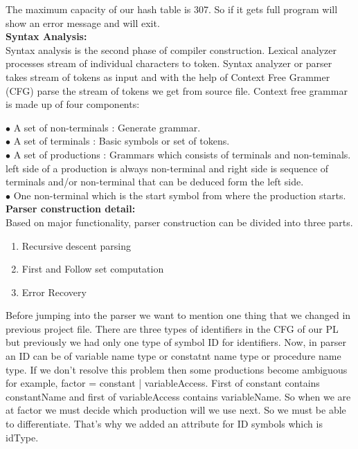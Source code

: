 \documentclass[paper=letter, fontsize=12pt]{scrartcl} %
\begin{document}
The maximum capacity of our hash table is 307. So if it gets full program will show an error message and will exit.  \\

\pagebreak
{\bf {\huge Syntax Analysis:}}\\
Syntax analysis is the second phase of compiler construction. Lexical analyzer processes stream of individual characters to token. Syntax analyzer or parser takes stream of tokens as input and with the help of Context Free Grammer (CFG) parse the stream of tokens we get from source file. Context free grammar is made up of four components:

$\bullet$ A set of non-terminals : Generate grammar.\\
$\bullet$ A set of terminals : Basic symbols or set of tokens.\\
$\bullet$ A set of productions : Grammars which consists of terminals and non-teminals. left side of a production is always non-terminal and right side is sequence of terminals and/or non-terminal that can be deduced form the left side.\\
$\bullet$ One non-terminal which is the start symbol from where the production starts.\\


{\bf Parser construction detail:}\\

Based on major functionality, parser construction can be divided into three parts.
\begin{enumerate}  
	\item Recursive descent parsing 
	\item First and Follow set computation
	\item Error Recovery
\end{enumerate}

Before jumping into the parser we want to mention one thing that we changed in previous project file. There are three types of identifiers in the CFG of our PL but previously we had only one type of symbol ID for identifiers. Now, in parser an ID can be of variable name type or constatnt name type or procedure name type. If we don't resolve this problem then some productions become ambiguous for example, factor = constant | variableAccess. First of constant contains constantName and first of variableAccess contains variableName. So when we are at factor we must decide which production will we use next. So we must be able to differentiate. That's why we added an attribute for ID symbols which is idType.\\
\end{document}
